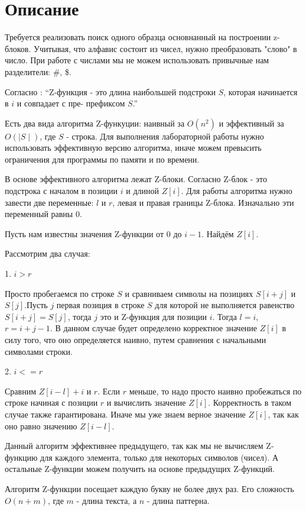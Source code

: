 \section{Описание}

Требуется реализовать поиск одного образца основнанный на построении z-блоков. Учитывая, что алфавис состоит из чисел,
нужно преобразовать "слово" в число. При работе с числами мы не можем использовать привычные нам разделители:
\#, \$.


Согласно \cite{Gasfild}: \enquote{Z-функция - это длина наибольшей подстроки $S$, которая начинается в $i$ и совпадает с пре-
префиксом $S$.}

Есть два вида алгоритма Z-функуции: наивный за $O(n^2)$ и эффективный за $O(\mid S \mid)$, где $S$ - строка.
Для выполнения лабораторной работы нужно использовать эффективную версию алгоритма, 
иначе можем превысить ограничения для программы по памяти и по времени.


В основе эффективного алгоритма лежат Z-блоки. Согласно \cite{Gasfild} Z-блок - это подстрока с началом в позиции $i$
и длиной $Z[i]$. Для работы алгоритма нужно завести две переменные: $l$ и $r$, левая и правая границы Z-блока.
Изначально эти переменный равны $0$.


Пусть нам известны значения Z-функции от $0$ до $i-1$. Найдём $Z[i]$. 

Рассмотрим два случая:

1. $i > r$

Просто пробегаемся по строке $S$ и сравниваем символы на позициях $S[i+j]$ и $S[j]$.Пусть $j$ первая позиция 
в строке $S$ для которой не выполняется равенство $S[i + j] = S[j]$, тогда $j$ это и Z-функция для позиции $i$. 
Тогда $l = i$, $r = i + j - 1$. В данном случае будет определено корректное значение $Z[i]$
в силу того, что оно определяется наивно, путем сравнения с начальными символами строки.

2. $i <= r$

Сравним $Z[i-l] + i$ и $r$. Если $r$ меньше, то надо просто наивно пробежаться по строке начиная с 
позиции $r$ и вычислить значение $Z[i]$. Корректность в таком случае также гарантирована. 
Иначе мы уже знаем верное значение $Z[i]$, так как оно равно значению $Z[i-l]$.


Данный алгоритм эффективнее предыдущего, так как мы не вычисляем Z-функцию для каждого элемента, только для некоторых
символов (чисел). А остальные Z-функции можем получить на основе предыдущих Z-функций.

Алгоритм Z-функции посещает каждую букву не более двух раз. Его сложность $O(n + m)$, где $m$ - длина текста,
а $n$ - длина паттерна.


